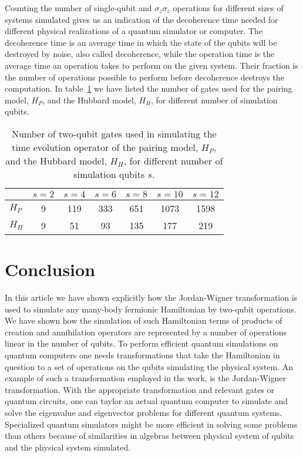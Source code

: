 \documentclass[aps,pra,twocolumn,floatfix]{revtex4}
\begin{document}
Counting the number of single-qubit and $\sigma_z\sigma_z$ operations
for different sizes of systems simulated gives us an indication of the
decoherence time needed for different physical realizations of a
quantum simulator or computer. The decoherence time is an average time
in which the state of the qubits will be destroyed by noise, also called 
decoherence, while the operation time is the average time an operation takes
to perform on the given system. Their fraction is the number of
operations possible to perform before decoherence destroys the
computation. In table~\ref{fig:noOfGates} we have listed the number of
gates used for the pairing model, $H_P$, and the Hubbard model, $H_H$,
for different number of simulation qubits. 
\begin{table}[h!]
\begin{center}
\begin{tabular}{l|cccccc}\hline\hline
	 & $s=2$&$s=4$&$s=6$&$s=8$&$s=10$ & $s=12$ \\ \hline
	 $H_P$ & 9 & 119 & 333 & 651 & 1073 & 1598 \\ \hline
         $H_H$ & 9 &  51 &  93 & 135 & 177  & 219  \\ \hline
\end{tabular}
\end{center}
\caption{Number of two-qubit gates used in simulating the time
  evolution operator of the pairing model, $H_P$, and the Hubbard
  model, $H_H$, for different number of simulation qubits $s$.}
\label{fig:noOfGates}
\end{table}



\section{Conclusion}
\label{sec:conclusion}
In this article we have shown explicitly how the Jordan-Wigner
transformation is used to simulate any many-body fermionic Hamiltonian
by two-qubit operations. We have shown how the simulation of such
Hamiltonian terms of products of creation and annihilation operators
are represented by a number of operations linear in the number of
qubits. 
To perform efficient quantum simulations on quantum computers one
needs transformations that take the Hamiltonian in question to a set
of operations on the qubits simulating the physical system. An example of 
such a transformation employed in ths work, is 
the Jordan-Wigner transformation.  With the appropriate transformation and
relevant gates or quantum circuits, one can taylor  an actual quantum computer to
simulate and solve the eigenvalue and eigenvector problems for different quantum systems. 
Specialized quantum simulators might be more efficient in solving some
problems than others because of similarities in algebras between physical system
of qubits and the physical system simulated. 
\end{document}
